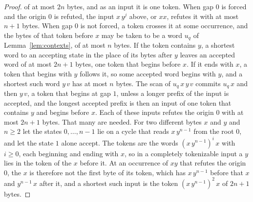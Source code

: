 \documentclass[11pt,a4paper]{article}
\theoremstyle{definition}
\theoremstyle{plain}
\begin{document}
\begin{proof}
of at most $2n$ bytes, and as an input it is one token. When gap $0$ is forced and the origin $0$ is refuted, the input
$x\, y^{j}$ above, or $xx$, refutes it with at most $n + 1$ bytes. When gap $0$ is not forced, a token crosses it at
some occurrence, and the bytes of that token before $x$ may be taken to be a word $u_q$ of Lemma~\ref{lem:contexts}, of
at most $n$ bytes. If the token contains $y$, a shortest word to an accepting state in the place of its bytes after $y$
leaves an accepted word of at most $2n + 1$ bytes, one token that begins before $x$. If it ends with $x$, a token that
begins with $y$ follows it, so some accepted word begins with $y$, and a shortest such word $y\, v$ has at most $n$
bytes. The scan of $u_q\, x\, y\, v$ commits $u_q\, x$ and then $y\, v$, a token that begins at gap $1$, unless a longer
prefix of the input is accepted, and the longest accepted prefix is then an input of one token that contains $y$ and
begins before $x$. Each of these inputs refutes the origin $0$ with at most $2n + 1$ bytes. That many are needed. For
two different bytes $x$ and $y$ and $n \geq 2$ let the states $0, \ldots, n - 1$ lie on a cycle that reads $x\, y^{n-1}$
from the root $0$, and let the state $1$ alone accept. The tokens are the words $(x\, y^{n-1})^i\, x$ with $i \geq 0$,
each beginning and ending with $x$, so in a completely tokenizable input a $y$ lies in the token of the $x$ before it.
At an occurrence of $xy$ that refutes the origin $0$, the $x$ is therefore not the first byte of its token, which has
$x\, y^{n-1}$ before that $x$ and $y^{n-1}\, x$ after it, and a shortest such input is the token $(x\, y^{n-1})^2\, x$
of $2n + 1$ bytes.


\end{proof}
\end{document}
